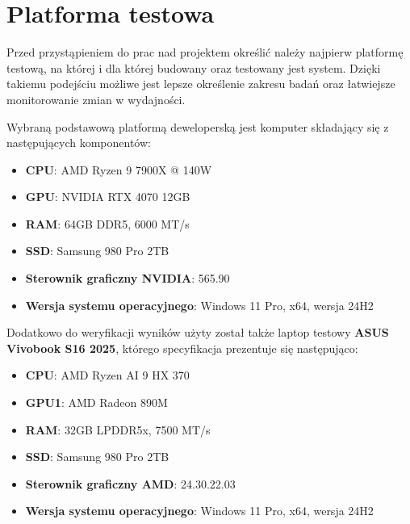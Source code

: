 \chapter{Platforma testowa}

Przed przystąpieniem do prac nad projektem określić należy najpierw
platformę testową, na której i dla której budowany oraz testowany jest
system. Dzięki takiemu podejściu możliwe jest lepsze określenie zakresu
badań oraz łatwiejsze monitorowanie zmian w wydajności.

Wybraną podstawową platformą deweloperską jest komputer składający się z
następujących komponentów:

\begin{itemize}
	\item \textbf{CPU}: AMD Ryzen 9 7900X @ 140W
	\item \textbf{GPU}: NVIDIA RTX 4070 12GB
	\item \textbf{RAM}: 64GB DDR5, 6000 MT/s
	\item \textbf{SSD}: Samsung 980 Pro 2TB
	\item \textbf{Sterownik graficzny NVIDIA}: 565.90
	\item \textbf{Wersja systemu operacyjnego}: Windows 11 Pro, x64, wersja 24H2
\end{itemize}

Dodatkowo do weryfikacji wyników użyty został także laptop testowy \textbf{ASUS Vivobook S16 2025}, którego specyfikacja
prezentuje się następująco:

\begin{itemize}
	\item \textbf{CPU}: AMD Ryzen AI 9 HX 370
	\item \textbf{GPU1}: AMD Radeon 890M
	\item \textbf{RAM}: 32GB LPDDR5x, 7500 MT/s
	\item \textbf{SSD}: Samsung 980 Pro 2TB
	\item \textbf{Sterownik graficzny AMD}: 24.30.22.03
	\item \textbf{Wersja systemu operacyjnego}: Windows 11 Pro, x64, wersja 24H2
\end{itemize}